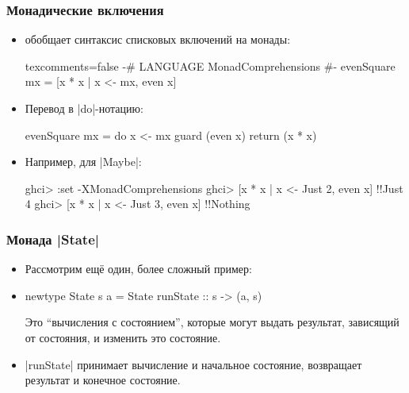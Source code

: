 \documentclass[11pt]{beamer}
\begin{document}
\begin{frame}[fragile]
  \frametitle{Монадические включения}
  \begin{itemize}
    \item \href{https://downloads.haskell.org/~ghc/latest/docs/users_guide/exts/monad_comprehensions.html}{} обобщает синтаксис списковых включений на монады:
          \begin{haskellsmall*}{texcomments=false}
            {-# LANGUAGE MonadComprehensions #-}
            evenSquare mx = [x * x | x <- mx, even x]
          \end{haskellsmall*}
          \pause
    \item Перевод в \haskinline|do|-нотацию:
          \begin{haskellsmall}
            evenSquare mx = do x <- mx
                               guard (even x)
                               return (x * x)
          \end{haskellsmall}
          \pause
    \item Например, для \haskinline|Maybe|:
          \begin{haskellsmall}
            ghci> :set -XMonadComprehensions
            ghci> [x * x | x <- Just 2, even x]
            !\pause!Just 4
            ghci> [x * x | x <- Just 3, even x]
            !\pause!Nothing
          \end{haskellsmall}
  \end{itemize}
\end{frame}

\begin{frame}[fragile]
  \frametitle{Монада \haskinline|State|}
  \begin{itemize}
    \item Рассмотрим ещё один, более сложный пример:
    \item
          \begin{haskellsmall}
            newtype State s a = State { runState :: s -> (a, s) }
          \end{haskellsmall}
          Это \enquote{вычисления с состоянием}, которые могут выдать результат, зависящий от состояния, и изменить это состояние.
    \item \haskinline|runState| принимает вычисление и начальное состояние, возвращает результат и конечное состояние.
  \end{itemize}
\end{frame}
\end{document}
